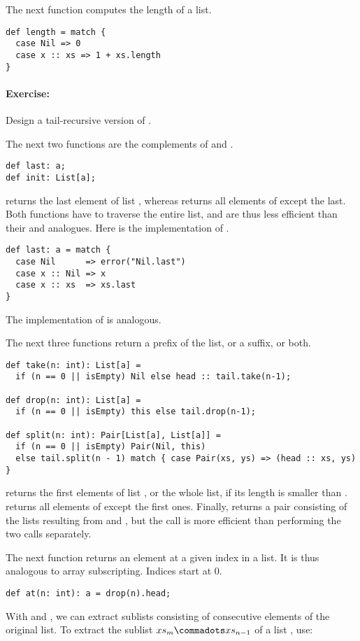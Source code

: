 \documentclass[a4paper,12pt,twoside,titlepage]{book}
\newcommand{\exercise}{\paragraph{Exercise:}}
\begin{document}
The next function computes the length of a list.
\begin{lstlisting}
def length = match {
  case Nil => 0
  case x :: xs => 1 + xs.length
}
\end{lstlisting}

\exercise Design a tail-recursive version of .

The next two functions are the complements of  and
.
\begin{lstlisting}
def last: a;
def init: List[a];
\end{lstlisting}
 returns the last element of list , whereas
 returns all elements of  except the last.
Both functions have to traverse the entire list, and are thus less
efficient than their  and  analogues.
Here is the implementation of .
\begin{lstlisting}
def last: a = match {
  case Nil      => error("Nil.last")
  case x :: Nil => x
  case x :: xs  => xs.last
}
\end{lstlisting}
The implementation of  is analogous.

The next three functions return a prefix of the list, or a suffix, or
both.
\begin{lstlisting}
def take(n: int): List[a] = 
  if (n == 0 || isEmpty) Nil else head :: tail.take(n-1);

def drop(n: int): List[a] = 
  if (n == 0 || isEmpty) this else tail.drop(n-1);

def split(n: int): Pair[List[a], List[a]] = 
  if (n == 0 || isEmpty) Pair(Nil, this)
  else tail.split(n - 1) match { case Pair(xs, ys) => (head :: xs, ys) }
\end{lstlisting}
 returns the first  elements of list
, or the whole list, if its length is smaller than .
 returns all elements of  except the
 first ones. Finally,  returns a pair
consisting of the lists resulting from  and
, but the call is more efficient than performing the
two calls separately. 

The next function returns an element at a given index in a list.
It is thus analogous to array subscripting. Indices start at 0.
\begin{lstlisting}   
def at(n: int): a = drop(n).head;
\end{lstlisting}

With  and , we can extract sublists consisting
of consecutive elements of the original list.  To extract the sublist
$xs_m \commadots xs_{n-1}$ of a list , use:
\end{document}
